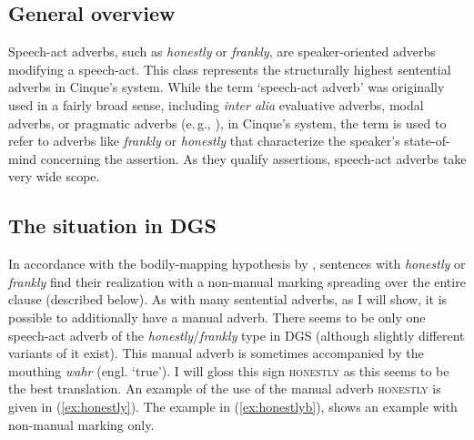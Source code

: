 \subsection{General overview}
Speech-act adverbs, such as \textit{honestly} or \textit{frankly}, are speaker-oriented adverbs modifying a speech-act. This class represents the structurally highest sentential adverbs in Cinque's system. While the term `speech-act adverb' was originally used in a fairly broad sense, including \textit{inter alia} evaluative adverbs, modal
adverbs, or pragmatic adverbs (e.\,g., \citealt{jackendoff1972semantic, bellert1977semantic}), in Cinque's system, the term is used to refer to adverbs like \textit{frankly} or \textit{honestly} that characterize the speaker's state-of-mind concerning the assertion. As they qualify assertions, speech-act adverbs take very wide scope.

\subsection{The situation in DGS}
In accordance with the bodily-mapping hypothesis by \citet{bross2017scope}, sentences with \textit{honestly} or \textit{frankly} find their realization with a non-manual marking spreading over the entire clause (described below). As with many sentential adverbs, as I will show, it is possible to additionally have a manual adverb. There seems to be only one speech-act adverb of the \textit{honestly}/\textit{frankly} type in DGS (although slightly different variants of it exist). This manual adverb is sometimes accompanied by the mouthing \textit{wahr} (engl. `true'). I will gloss this sign \textsc{honestly} as this seems to be the best translation. An example of the use of the manual adverb \textsc{honestly} is given in (\ref{ex:honestly}). The example in (\ref{ex:honestlyb}), shows an example with non-manual marking only.

